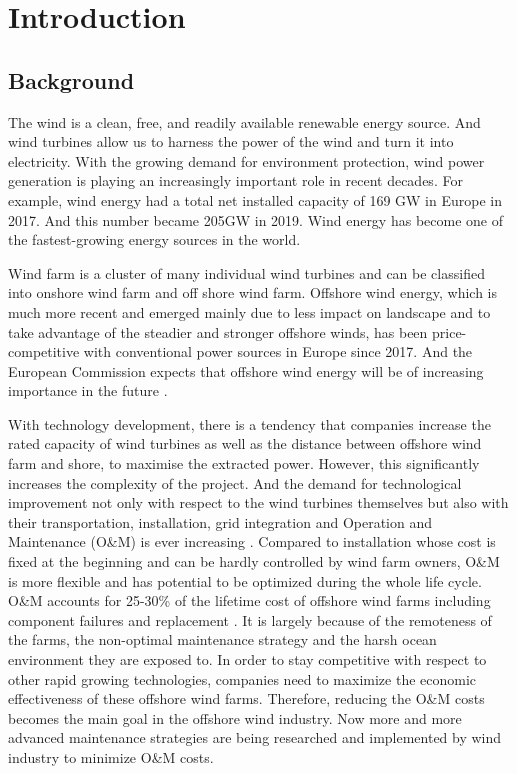 \section{Introduction}

\subsection{Background}

The wind is a clean, free, and readily available renewable energy source. And wind turbines allow us to harness the power of the wind and turn it into electricity. With the growing demand for environment protection, wind power generation is playing an increasingly important role in recent decades. For example, wind energy had a total net installed capacity of 169 GW in Europe in 2017. And this number became 205GW in 2019. Wind energy has become one of the fastest-growing energy sources in the world.

Wind farm is a cluster of many individual wind turbines and can be classified into onshore wind farm and off shore wind farm. Offshore wind energy, which is much more recent and emerged mainly due to less impact on landscape and to take advantage of the steadier and stronger offshore winds, has been price-competitive with conventional power sources in Europe since 2017. And the European Commission expects that offshore wind energy will be of increasing importance in the future \cite{Keyenergy}.

With technology development, there is a tendency that companies increase the rated capacity of wind turbines as well as the distance between offshore wind farm and shore, to maximise the extracted power. However, this significantly increases the complexity of the project. And the demand for technological improvement not only with respect to the wind turbines themselves but also with their transportation, installation, grid integration and Operation and Maintenance (O\&M) is ever increasing \cite{Sofia}. Compared to installation whose cost is fixed at the beginning and can be hardly controlled by wind farm owners, O\&M is more flexible and has potential to be optimized during the whole life cycle. O\&M accounts for 25-30\% of the lifetime cost of offshore wind farms including component failures and replacement \cite{Sofia}. It is largely because of the remoteness of the farms, the non-optimal maintenance strategy and the harsh ocean environment they are exposed to. In order to stay competitive with respect to other rapid growing technologies, companies need to maximize the economic effectiveness of these offshore wind farms. Therefore, reducing the O\&M costs becomes the main goal in the offshore wind industry. Now more and more advanced maintenance strategies are being researched and implemented by wind industry to minimize O\&M costs.

